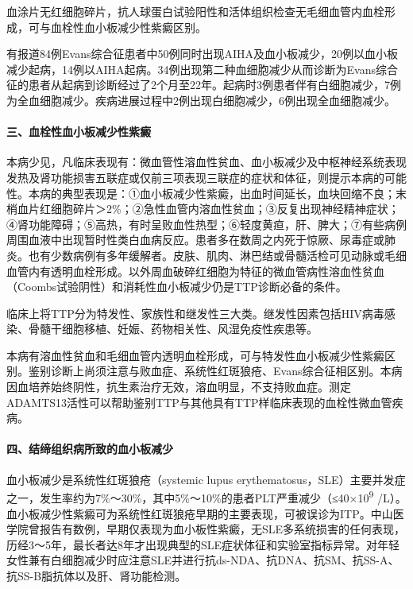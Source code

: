 血涂片无红细胞碎片，抗人球蛋白试验阳性和活体组织检查无毛细血管内血栓形成，可与血栓性血小板减少性紫癜区别。

有报道84例Evans综合征患者中50例同时出现AIHA及血小板减少，20例以血小板减少起病，14例以AIHA起病。34例出现第二种血细胞减少从而诊断为Evans综合征的患者从起病到诊断经过了2个月至22年。起病时3例患者伴有白细胞减少，7例为全血细胞减少。疾病进展过程中2例出现白细胞减少，6例出现全血细胞减少。

\paragraph{三、血栓性血小板减少性紫癜}

本病少见，凡临床表现有：微血管性溶血性贫血、血小板减少及中枢神经系统表现发热及肾功能损害五联症或仅前三项表现三联症的症状和体征，则提示本病的可能性。本病的典型表现是：①血小板减少性紫癜，出血时间延长，血块回缩不良；末梢血片红细胞碎片＞2\%；②急性血管内溶血性贫血；③反复出现神经精神症状；④肾功能障碍；⑤高热，有时呈败血性热型；⑥轻度黄疸，肝、脾大；⑦有些病例周围血液中出现暂时性类白血病反应。患者多在数周之内死于惊厥、尿毒症或肺炎。也有少数病例有多年缓解者。皮肤、肌肉、淋巴结或骨髓活检可见动脉或毛细血管内有透明血栓形成。以外周血破碎红细胞为特征的微血管病性溶血性贫血（Coombs试验阴性）和消耗性血小板减少仍是TTP诊断必备的条件。

临床上将TTP分为特发性、家族性和继发性三大类。继发性因素包括HIV病毒感染、骨髓干细胞移植、妊娠、药物相关性、风湿免疫性疾患等。

本病有溶血性贫血和毛细血管内透明血栓形成，可与特发性血小板减少性紫癜区别。鉴别诊断上尚须注意与败血症、系统性红斑狼疮、Evans综合征相区别。本病因血培养始终阴性，抗生素治疗无效，溶血明显，不支持败血症。测定ADAMTS13活性可以帮助鉴别TTP与其他具有TTP样临床表现的血栓性微血管疾病。

\paragraph{四、结缔组织病所致的血小板减少}

血小板减少是系统性红斑狼疮（systemic lupus
erythematosus，SLE）主要并发症之一，发生率约为7\%～30\%，其中5\%～10\%的患者PLT严重减少（≤40×10\textsuperscript{9}
/L）。血小板减少性紫癜可为系统性红斑狼疮早期的主要表现，可被误诊为ITP。中山医学院曾报告有数例，早期仅表现为血小板性紫癜，无SLE多系统损害的任何表现，历经3～5年，最长者达8年才出现典型的SLE症状体征和实验室指标异常。对年轻女性兼有白细胞减少时应注意SLE并进行抗ds-NDA、抗DNA、抗SM、抗SS-A、抗SS-B脂抗体以及肝、肾功能检测。

